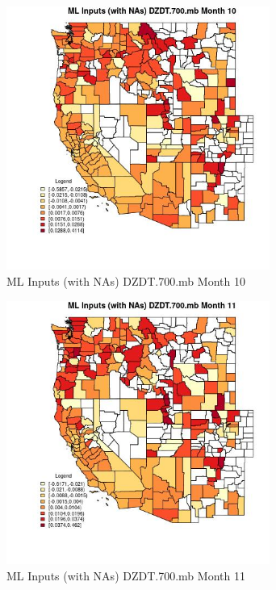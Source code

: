 \begin{figure} 
\centering  
\includegraphics[width=0.77\textwidth]{Code_Outputs/Report_ML_input_PM25_Step4_part_f_de_duplicated_aves_prioritize_24hr_obswNAs_CountyDZDT700mbmedianMonth10.jpg} 
\caption{\label{fig:Report_ML_input_PM25_Step4_part_f_de_duplicated_aves_prioritize_24hr_obswNAsCountyDZDT700mbmedianMonth10}ML Inputs (with NAs) DZDT.700.mb Month 10} 
\end{figure} 
 

\begin{figure} 
\centering  
\includegraphics[width=0.77\textwidth]{Code_Outputs/Report_ML_input_PM25_Step4_part_f_de_duplicated_aves_prioritize_24hr_obswNAs_CountyDZDT700mbmedianMonth11.jpg} 
\caption{\label{fig:Report_ML_input_PM25_Step4_part_f_de_duplicated_aves_prioritize_24hr_obswNAsCountyDZDT700mbmedianMonth11}ML Inputs (with NAs) DZDT.700.mb Month 11} 
\end{figure} 
 

